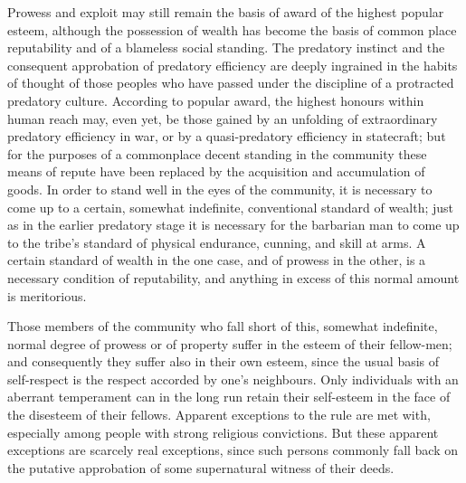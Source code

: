 \documentclass[12pt]{report}
\begin{document}
Prowess and exploit may still remain the basis of award of the highest
popular esteem, although the possession of wealth has become the basis
of common place reputability and of a blameless social standing.
The predatory instinct and the consequent approbation of predatory
efficiency are deeply ingrained in the habits of thought of those
peoples who have passed under the discipline of a protracted predatory
culture. According to popular award, the highest honours within human
reach may, even yet, be those gained by an unfolding of extraordinary
predatory efficiency in war, or by a quasi-predatory efficiency in
statecraft; but for the purposes of a commonplace decent standing in the
community these means of repute have been replaced by the acquisition
and accumulation of goods. In order to stand well in the eyes of the
community, it is necessary to come up to a certain, somewhat indefinite,
conventional standard of wealth; just as in the earlier predatory stage
it is necessary for the barbarian man to come up to the tribe's standard
of physical endurance, cunning, and skill at arms. A certain standard
of wealth in the one case, and of prowess in the other, is a necessary
condition of reputability, and anything in excess of this normal amount
is meritorious.

Those members of the community who fall short of this, somewhat
indefinite, normal degree of prowess or of property suffer in the esteem
of their fellow-men; and consequently they suffer also in their own
esteem, since the usual basis of self-respect is the respect accorded by
one's neighbours. Only individuals with an aberrant temperament can in
the long run retain their self-esteem in the face of the disesteem of
their fellows. Apparent exceptions to the rule are met with, especially
among people with strong religious convictions. But these apparent
exceptions are scarcely real exceptions, since such persons commonly
fall back on the putative approbation of some supernatural witness of
their deeds.
\end{document}
